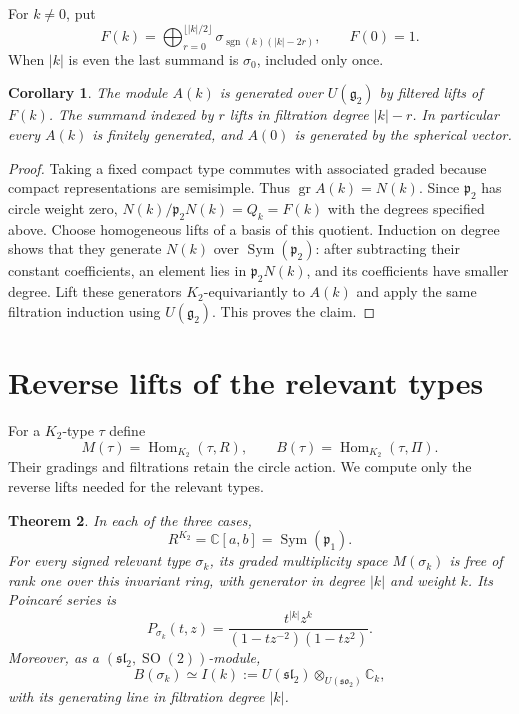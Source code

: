 \documentclass[11pt]{article}
\newcommand{\C}{\mathbb C}
\newcommand{\Sym}{\operatorname{Sym}}
\newcommand{\Hom}{\operatorname{Hom}}
\newcommand{\gr}{\operatorname{gr}}
\newcommand{\SO}{\operatorname{SO}}
\newcommand{\fg}{\mathfrak g}
\newcommand{\fp}{\mathfrak p}
\newtheorem{theorem}{Theorem}[section]
\newtheorem{corollary}[theorem]{Corollary}
\theoremstyle{definition}
\numberwithin{equation}{section}
\begin{document}
For $k\ne0$, put
\begin{equation}\label{eq:Fk}
 F(k)=\bigoplus_{r=0}^{\lfloor |k|/2\rfloor}
        \sigma_{\operatorname{sgn}(k)(|k|-2r)},\qquad F(0)=1.
\end{equation}
When $|k|$ is even the last summand is $\sigma_0$, included only once.

\begin{corollary}\label{cor:forward}
The module $A(k)$ is generated over $U(\fg_2)$ by filtered lifts of
$F(k)$. The summand indexed by $r$ lifts in filtration degree $|k|-r$.
In particular every $A(k)$ is finitely generated, and $A(0)$ is generated
by the spherical vector.
\end{corollary}
\begin{proof}
Taking a fixed compact type commutes with associated graded because
compact representations are semisimple. Thus $\gr A(k)=N(k)$. Since
$\fp_2$ has circle weight zero,
$N(k)/\fp_2N(k)=Q_k=F(k)$ with the degrees specified above.
Choose homogeneous lifts of a basis of this quotient. Induction on
degree shows that they generate $N(k)$ over $\Sym(\fp_2)$: after
subtracting their constant coefficients, an element lies in $\fp_2N(k)$,
and its coefficients have smaller degree. Lift these generators
$K_2$-equivariantly to $A(k)$ and apply the same filtration induction
using $U(\fg_2)$. This proves the claim.
\end{proof}

\section{Reverse lifts of the relevant types}\label{sec:reverse}
For a $K_2$-type $\tau$ define
\[
 M(\tau)=\Hom_{K_2}(\tau,R),\qquad
 B(\tau)=\Hom_{K_2}(\tau,\Pi).
\]
Their gradings and filtrations retain the circle action. We compute only
the reverse lifts needed for the relevant types.

\begin{theorem}\label{thm:reverse}
In each of the three cases,
\begin{equation}\label{eq:invariants}
 R^{K_2}=\C[a,b]=\Sym(\fp_1).
\end{equation}
For every signed relevant type $\sigma_k$, its graded multiplicity space
$M(\sigma_k)$ is free of rank one over this invariant ring, with generator in degree
$|k|$ and weight $k$. Its Poincar\'e series is
\begin{equation}\label{eq:reverseP}
 P_{\sigma_k}(t,z)=
 \frac{t^{|k|}z^k}{(1-tz^{-2})(1-tz^2)}.
\end{equation}
Moreover, as a $(\mathfrak{sl}_2,\SO(2))$-module,
\begin{equation}\label{eq:universal}
 B(\sigma_k)\simeq I(k):=
 U(\mathfrak{sl}_2)\otimes_{U(\mathfrak{so}_2)}\C_k,
\end{equation}
with its generating line in filtration degree $|k|$.
\end{theorem}
\end{document}
